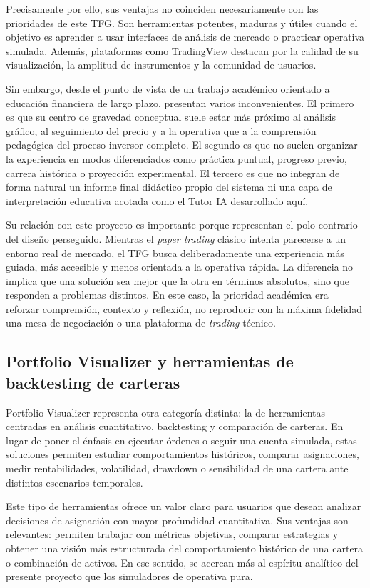 Precisamente por ello, sus ventajas no coinciden necesariamente con las prioridades de este TFG. Son herramientas potentes, maduras y útiles cuando el objetivo es aprender a usar interfaces de análisis de mercado o practicar operativa simulada. Además, plataformas como TradingView destacan por la calidad de su visualización, la amplitud de instrumentos y la comunidad de usuarios.

Sin embargo, desde el punto de vista de un trabajo académico orientado a educación financiera de largo plazo, presentan varios inconvenientes. El primero es que su centro de gravedad conceptual suele estar más próximo al análisis gráfico, al seguimiento del precio y a la operativa que a la comprensión pedagógica del proceso inversor completo. El segundo es que no suelen organizar la experiencia en modos diferenciados como práctica puntual, progreso previo, carrera histórica o proyección experimental. El tercero es que no integran de forma natural un informe final didáctico propio del sistema ni una capa de interpretación educativa acotada como el Tutor IA desarrollado aquí.

Su relación con este proyecto es importante porque representan el polo contrario del diseño perseguido. Mientras el \textit{paper trading} clásico intenta parecerse a un entorno real de mercado, el TFG busca deliberadamente una experiencia más guiada, más accesible y menos orientada a la operativa rápida. La diferencia no implica que una solución sea mejor que la otra en términos absolutos, sino que responden a problemas distintos. En este caso, la prioridad académica era reforzar comprensión, contexto y reflexión, no reproducir con la máxima fidelidad una mesa de negociación o una plataforma de \textit{trading} técnico.

\subsection{Portfolio Visualizer y herramientas de backtesting de carteras}

Portfolio Visualizer \cite{portfolio_visualizer} representa otra categoría distinta: la de herramientas centradas en análisis cuantitativo, backtesting y comparación de carteras. En lugar de poner el énfasis en ejecutar órdenes o seguir una cuenta simulada, estas soluciones permiten estudiar comportamientos históricos, comparar asignaciones, medir rentabilidades, volatilidad, drawdown o sensibilidad de una cartera ante distintos escenarios temporales.

Este tipo de herramientas ofrece un valor claro para usuarios que desean analizar decisiones de asignación con mayor profundidad cuantitativa. Sus ventajas son relevantes: permiten trabajar con métricas objetivas, comparar estrategias y obtener una visión más estructurada del comportamiento histórico de una cartera o combinación de activos. En ese sentido, se acercan más al espíritu analítico del presente proyecto que los simuladores de operativa pura.

